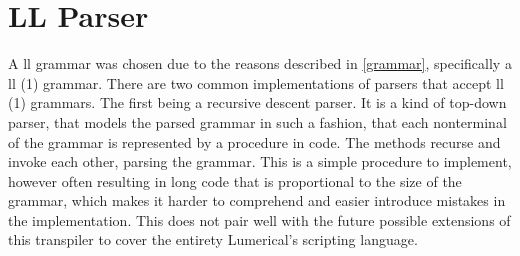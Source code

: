 \section{LL Parser}
A \gls{ll} grammar was chosen due to the reasons described in \cref{grammar}, specifically a \gls{ll} (1) grammar. There are two common implementations of parsers that accept \gls{ll} (1) grammars. The first being a recursive descent parser. It is a kind of top-down parser, that models the parsed grammar in such a fashion, that each nonterminal of the grammar is represented by a procedure in code. The methods recurse and invoke each other, parsing the grammar. This is a simple procedure to implement, however often resulting in long code that is proportional to the size of the grammar, which makes it harder to comprehend and easier introduce mistakes in the implementation. This does not pair well with the future possible extensions of this transpiler to cover the entirety Lumerical's scripting language.

